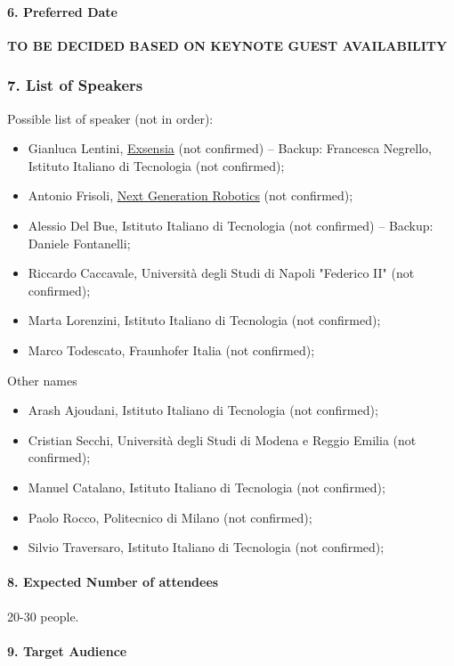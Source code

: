 \documentclass{article}
\begin{document}
\paragraph{6. Preferred Date} \textbf{TO BE DECIDED BASED ON KEYNOTE GUEST AVAILABILITY}


\subsubsection*{7. List of Speakers}
Possible list of speaker (not in order):
\begin{itemize}
    \item Gianluca Lentini, \href{https://exsensia.ai/}{Exsensia} (not confirmed) -- Backup:
    Francesca Negrello, Istituto Italiano di Tecnologia (not confirmed);
    \item Antonio Frisoli, \href{https://nextgen-robotics.it/}{Next Generation Robotics} (not confirmed);
    \item Alessio Del Bue, Istituto Italiano di Tecnologia (not confirmed) -- Backup: Daniele Fontanelli;
    \item Riccardo Caccavale, Università degli Studi di Napoli "Federico II" (not confirmed);
    \item Marta Lorenzini, Istituto Italiano di Tecnologia (not confirmed);
    \item Marco Todescato, Fraunhofer Italia (not confirmed);
\end{itemize}
Other names
\begin{itemize}
    \item Arash Ajoudani, Istituto Italiano di Tecnologia (not confirmed);
    \item Cristian Secchi, Università degli Studi di Modena e Reggio Emilia (not confirmed);
    \item Manuel Catalano, Istituto Italiano di Tecnologia (not confirmed);
    \item Paolo Rocco, Politecnico di Milano (not confirmed);
    \item Silvio Traversaro, Istituto Italiano di Tecnologia (not confirmed);
\end{itemize}


\paragraph{8. Expected Number of attendees} 20-30 people.


\paragraph{9. Target Audience} 
\end{document}
